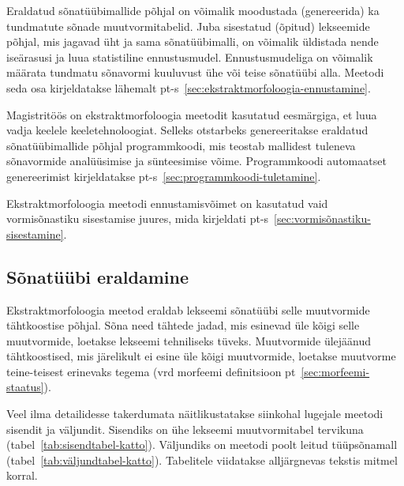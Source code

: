 \documentclass[12pt,a4paper]{article}
\begin{document}
Eraldatud sõnatüübimallide põhjal on võimalik moodustada (genereerida) ka tundmatute sõnade muutvormi\-tabelid. Juba sisestatud (õpitud) lekseemide põhjal, mis jagavad üht ja sama sõnatüübimalli, on võimalik üldistada nende iseärasusi ja luua statistiline ennustus\-mudel. Ennustus\-mudeliga on võimalik määrata tundmatu sõnavormi kuuluvust ühe või teise sõnatüübi alla. Meetodi seda osa kirjeldatakse lähemalt pt-s~\ref{sec:ekstraktmorfoloogia-ennustamine}.

Magistritöös on ekstraktmorfoloogia meetodit kasutatud eesmärgiga, et luua vadja keelele keele\-tehnoloogiat. Selleks otstarbeks genereeritakse eraldatud sõnatüübi\-mallide põhjal programm\-koodi, mis teostab mallidest tuleneva sõnavormide analüüsimise ja sünteesimise võime. Programm\-koodi automaatset genereerimist kirjeldatakse pt-s~\ref{sec:programmkoodi-tuletamine}.

Ekstraktmorfoloogia meetodi ennustamisvõimet on kasutatud vaid vormisõnastiku sisestamise juures, mida kirjeldati pt-s~\ref{sec:vormisõnastiku-sisestamine}. %





\subsection{Sõnatüübi eraldamine}
\label{sec:ekstraktmorfoloogia-eraldamine}

Ekstraktmorfoloogia meetod eraldab lekseemi sõnatüübi selle muutvormide tähtkoostise põhjal. Sõna need tähtede jadad, mis esinevad üle kõigi selle muutvormide, loetakse lekseemi tehniliseks tüveks. Muutvormide ülejäänud tähtkoostised, mis järelikult ei esine üle kõigi muutvormide, loetakse muutvorme teine-teisest erinevaks tegema (vrd morfeemi definitsioon pt~\ref{sec:morfeemi-staatus}).

Veel ilma detailidesse takerdumata näitlikustatakse siinkohal lugejale meetodi sisendit ja väljundit. Sisendiks on ühe lekseemi muutvormitabel tervikuna (tabel~\ref{tab:sisendtabel-katto}). Väljundiks on meetodi poolt leitud tüüpsõnamall (tabel~\ref{tab:väljundtabel-katto}). Tabelitele viidatakse alljärgnevas tekstis mitmel korral.
\end{document}
